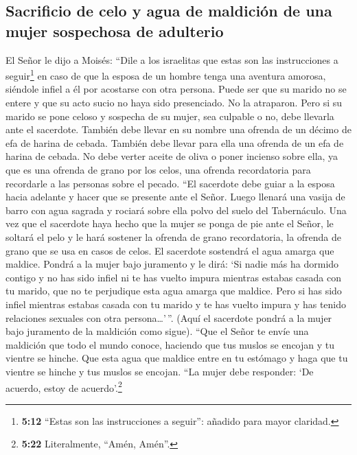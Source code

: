 \hypertarget{sacrificio-de-celo-y-agua-de-maldiciuxf3n-de-una-mujer-sospechosa-de-adulterio}{%
\subsection{Sacrificio de celo y agua de maldición de una mujer
sospechosa de
adulterio}\label{sacrificio-de-celo-y-agua-de-maldiciuxf3n-de-una-mujer-sospechosa-de-adulterio}}

 El Señor le dijo a Moisés:  ``Dile a los
israelitas que estas son las instrucciones a seguir\footnote{\textbf{5:12}
  ``Estas son las instrucciones a seguir'': añadido para mayor claridad.}
en caso de que la esposa de un hombre tenga una aventura amorosa,
siéndole infiel a él  por acostarse con otra persona.
Puede ser que su marido no se entere y que su acto sucio no haya sido
presenciado. No la atraparon.  Pero si su marido se pone
celoso y sospecha de su mujer, sea culpable o no,  debe
llevarla ante el sacerdote. También debe llevar en su nombre una ofrenda
de un décimo de efa de harina de cebada. También debe llevar para ella
una ofrenda de un efa de harina de cebada. No debe verter aceite de
oliva o poner incienso sobre ella, ya que es una ofrenda de grano por
los celos, una ofrenda recordatoria para recordarle a las personas sobre
el pecado.  ``El sacerdote debe guiar a la esposa hacia
adelante y hacer que se presente ante el Señor.  Luego
llenará una vasija de barro con agua sagrada y rociará sobre ella polvo
del suelo del Tabernáculo.  Una vez que el sacerdote haya
hecho que la mujer se ponga de pie ante el Señor, le soltará el pelo y
le hará sostener la ofrenda de grano recordatoria, la ofrenda de grano
que se usa en casos de celos. El sacerdote sostendrá el agua amarga que
maldice.  Pondrá a la mujer bajo juramento y le dirá: `Si
nadie más ha dormido contigo y no has sido infiel ni te has vuelto
impura mientras estabas casada con tu marido, que no te perjudique esta
agua amarga que maldice.  Pero si has sido infiel
mientras estabas casada con tu marido y te has vuelto impura y has
tenido relaciones sexuales con otra persona\ldots{}'\,''.
 (Aquí el sacerdote pondrá a la mujer bajo juramento de
la maldición como sigue). ``Que el Señor te envíe una maldición que todo
el mundo conoce, haciendo que tus muslos se encojan y tu vientre se
hinche.  Que esta agua que maldice entre en tu estómago y
haga que tu vientre se hinche y tus muslos se encojan. ``La mujer debe
responder: `De acuerdo, estoy de acuerdo'.\footnote{\textbf{5:22}
  Literalmente, ``Amén, Amén''.}

